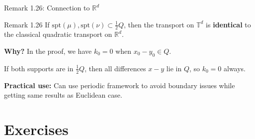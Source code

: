 \documentclass[aspectratio=169]{beamer}
\newcommand{\R}{\mathbb{R}}
\newcommand{\Td}{\mathbb{T}^d}
\begin{document}
\begin{frame}{Remark 1.26: Connection to $\R^d$}
\begin{block}{Remark 1.26}
If $\text{spt}(\mu), \text{spt}(\nu) \subset \frac{1}{2}Q$, then the transport on $\Td$ is \textbf{identical} to the classical quadratic transport on $\R^d$.
\end{block}

\vspace{0.3cm}
\textbf{Why?} In the proof, we have $k_0 = 0$ when $x_0 - y_0 \in Q$.

If both supports are in $\frac{1}{2}Q$, then all differences $x - y$ lie in $Q$, so $k_0 = 0$ always.

\vspace{0.4cm}
\begin{center}
\end{center}

\textbf{Practical use:} Can use periodic framework to avoid boundary issues while getting same results as Euclidean case.
\end{frame}

\section{Exercises}
\end{document}
